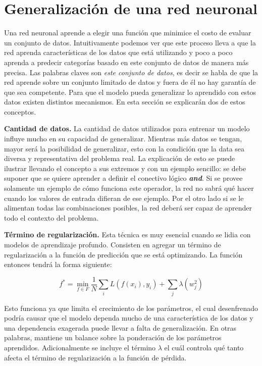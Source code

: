 \section{Generalización de una red neuronal}

Una red neuronal aprende a elegir una función que minimice el costo de evaluar un conjunto de datos. Intuitivamente podemos ver que este proceso lleva a que la red aprenda características de los datos que está utilizando y poco a poco aprenda a predecir categorías basado en este conjunto de datos de manera más precisa. Las palabras claves son \textit{este conjunto de datos}, es decir se habla de que la red aprende sobre un conjunto limitado de datos y fuera de él no hay garantía de que sea competente. Para que el modelo pueda generalizar lo aprendido con estos datos existen distintos mecanismos. En esta sección se explicarán dos de estos conceptos.

\textbf{Cantidad de datos.} La cantidad de datos utilizados para entrenar un modelo influye mucho en su capacidad de generalizar. Mientras más datos se tengan, mayor será la posibilidad de generalizar, esto con la condición que la data sea diversa y representativa del problema real. La explicación de esto se puede ilustrar llevando el concepto a sus extremos y con un ejemplo sencillo: se debe suponer que se quiere aprender a definir el conectivo lógico \textbf{\textit{and}}. Si se provee solamente un ejemplo de cómo funciona este operador, la red no sabrá qué hacer cuando los valores de entrada difieran de ese ejemplo. Por el otro lado si se le alimentan todas las combinaciones posibles, la red deberá ser capaz de aprender todo el contexto del problema.

\textbf{Término de regularización.} Esta técnica es muy esencial cuando se lidia con modelos de aprendizaje profundo. Consisten en agregar un término de regularización a la función de predicción que se está optimizando. La función entonces tendrá la forma siguiente: %

\[ f^* = \min_{f \in F} \frac{1}{N} \sum_{i} L(f(x_i), y_i) + \sum_{j} \lambda(w_j^2) \]

Esto funciona ya que limita el crecimiento de los parámetros, el cual desenfrenado podría causar que el modelo dependa mucho de una característica de los datos y una dependencia exagerada puede llevar a falta de generalización. En otras palabras, mantiene un balance sobre la ponderación de los parámetros aprendidos. Adicionalmente se incluye el término $\lambda$ el cuál controla qué tanto afecta el término de regularización a la función de pérdida.

